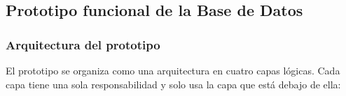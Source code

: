 %
%
%
%
%

\subsection{Prototipo funcional de la Base de Datos}
\label{sec:prototipo}

\subsubsection{Arquitectura del prototipo}
\label{sec:arquitectura}

El prototipo se organiza como una arquitectura en cuatro capas lógicas.
Cada capa tiene una sola responsabilidad y solo usa la capa que está
debajo de ella:

